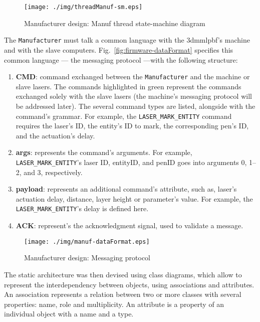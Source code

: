 \begin{figure}[!hbt]
  \centering
  \texttt{[image: ./img/threadManuf-sm.eps]}
  \caption{Manufacturer design: Manuf thread state-machine diagram}%
  \label{fig:threadManuf-sm}
\end{figure}

The \texttt{Manufacturer} must talk a common language with the \gls{3dmmlpbf}'s
machine and with the slave computers. Fig.~\ref{fig:firmware-dataFormat}
specifies this common language --- the messaging protocol ---with the following structure:
\begin{enumerate}
\item \textbf{CMD}: command exchanged between the \texttt{Manufacturer} and the
  machine or slave lasers. The commands highlighted in green represent the
  commands exchanged solely with the slave lasers (the machine's messaging
  protocol will be addressed later).
  The several command types are listed, alongside with the command's
  grammar. For example, the \texttt{LASER\_MARK\_ENTITY} command requires the
  laser's ID, the entity's ID to mark, the corresponding pen's ID, and the
  actuation's delay.
\item \textbf{args}: represents the command's arguments. For example,
  \texttt{LASER\_MARK\_ENTITY}'s laser ID, entityID, and penID goes into arguments
  0, 1--2, and 3, respectively.
\item \textbf{payload}: represents an additional command's attribute, such as,
  laser's actuation delay,
  distance, layer height or parameter's value. For example, the
  \texttt{LASER\_MARK\_ENTITY}'s delay is defined here.
\item \textbf{ACK}: represent's the acknowledgment signal, used to validate a message.
\end{enumerate}

\begin{figure}[!hbt]
  \centering
    \texttt{[image: ./img/manuf-dataFormat.eps]}
  \caption{Manufacturer design: Messaging protocol}\label{fig:manuf-dataFormat}
\end{figure}

The static architecture was then devised using class diagrams, which 
allow to represent the interdependency
between objects, using associations and attributes. An association represents a
relation between two or more classes with several properties: name, role and
multiplicity. An attribute is a property of an individual object with a name and
a type.

